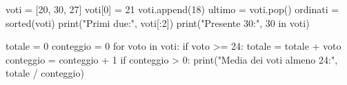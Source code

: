 \begin{unipdcode}[language=Python]
voti = [20, 30, 27]
voti[0] = 21
voti.append(18)
ultimo = voti.pop()
ordinati = sorted(voti)
print("Primi due:", voti[:2])
print("Presente 30:", 30 in voti)

totale = 0
conteggio = 0
for voto in voti:
    if voto >= 24:
        totale = totale + voto
        conteggio = conteggio + 1
if conteggio > 0:
    print("Media dei voti almeno 24:", totale / conteggio)
\end{unipdcode}
